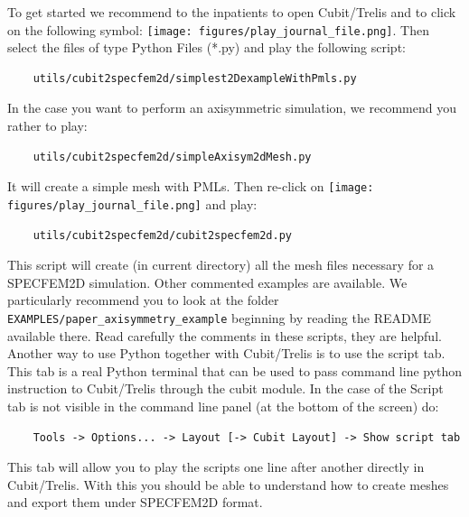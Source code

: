 To get started we recommend to the inpatients to open Cubit/Trelis and to click on the
following symbol: \texttt{[image: figures/play\_journal\_file.png]}. Then select the
files of type Python Files (*.py) and play the following script:
\begin{verbatim}
    utils/cubit2specfem2d/simplest2DexampleWithPmls.py
\end{verbatim}
In the case you want to perform an axisymmetric simulation, we recommend you rather to play:
\begin{verbatim}
    utils/cubit2specfem2d/simpleAxisym2dMesh.py
\end{verbatim}
It will create a simple mesh with PMLs. Then re-click on \texttt{[image: figures/play\_journal\_file.png]} and
play:
\begin{verbatim}
    utils/cubit2specfem2d/cubit2specfem2d.py
\end{verbatim}
This script will create (in current directory) all the mesh files necessary for a SPECFEM2D simulation.
Other commented examples are available. We particularly recommend you to look at the folder \newline
\texttt{EXAMPLES/paper\_axisymmetry\_example}
beginning by reading the README available there.
Read carefully the comments in these scripts, they are helpful.
Another way to use Python together with Cubit/Trelis is to use the script tab.
This tab is a real Python terminal that can be used to pass command line python
instruction to Cubit/Trelis through the cubit module.
In the case of the Script tab is not visible in the command line panel (at the bottom of the screen) do:
\begin{verbatim}
    Tools -> Options... -> Layout [-> Cubit Layout] -> Show script tab
\end{verbatim}
This tab will allow you to play the scripts one line after another directly in Cubit/Trelis.
With this you should be able to understand how to create meshes and export them under SPECFEM2D format.

